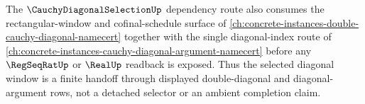 The $\CauchyDiagonalSelectionUp$ dependency route also consumes the rectangular-window and cofinal-schedule surface of \autoref{ch:concrete-instances-double-cauchy-diagonal-namecert} together with the single diagonal-index route of \autoref{ch:concrete-instances-cauchy-diagonal-argument-namecert} before any $\RegSeqRatUp$ or $\RealUp$ readback is exposed. Thus the selected diagonal window is a finite handoff through displayed double-diagonal and diagonal-argument rows, not a detached selector or an ambient completion claim.
